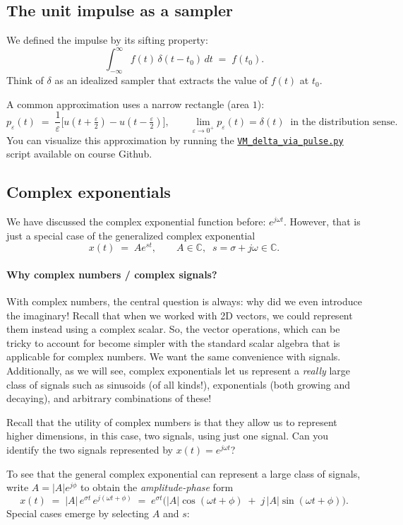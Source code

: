 \documentclass{ee102_notes}
\begin{document}
\subsection{The unit impulse as a sampler}
We defined the impulse by its sifting property:
\[
\int_{-\infty}^{\infty} f(t)\,\delta(t-t_0)\,dt \;=\; f(t_0).
\]
Think of $\delta$ as an idealized sampler that extracts the value of $f(t)$ at $t_0$.

A common approximation uses a narrow rectangle (area $1$):
\[
p_\varepsilon(t)\;=\;\frac{1}{\varepsilon}\Big[u\!\left(t+\tfrac{\varepsilon}{2}\right)-u\!\left(t-\tfrac{\varepsilon}{2}\right)\Big],
\qquad \lim_{\varepsilon\to 0^+} p_\varepsilon(t) = \delta(t)\;\; \text{in the distribution sense.}
\]
You can visualize this approximation by running the \href{https://github.com/ee-ucmerced/ee102-signals-systems/blob/main/lecture\_notes/week2\_signal\_properties/VM_delta_via_pulse.py}{{\tt VM\_delta\_via\_pulse.py}} script available on course Github.

\subsection{Complex exponentials}
We have discussed the complex exponential function before: $e^{j\omega t}$. However, that is just a special case of the generalized complex exponential
\[
x(t) \;=\; A e^{s t}, \qquad A\in\mathbb{C},\;\; s=\sigma + j\omega \in \mathbb{C}.
\]
\paragraph{Why complex numbers / complex signals?} 

With complex numbers, the central question is always: why did we even introduce the imaginary! Recall that when we worked with 2D vectors, we could represent them instead using a complex scalar. So, the vector operations, which can be tricky to account for become simpler with the standard scalar algebra that is applicable for complex numbers. We want the same convenience with signals. Additionally, as we will see, complex exponentials let us represent a \emph{really} large class of signals such as sinusoids (of all kinds!), exponentials (both growing and decaying), and arbitrary combinations of these!

\begin{popquiz} Recall that the utility of complex numbers is that they allow us to represent higher dimensions, in this case, two signals, using just one signal. Can you identify the two signals represented by $x(t) = e^{j\omega t}$?
\end{popquiz}
To see that the general complex exponential can represent a large class of signals, write $A = |A|e^{j\phi}$ to obtain the \emph{amplitude-phase} form
\[
x(t) \;=\; |A|\,e^{\sigma t}\,e^{j(\omega t + \phi)}
\;=\; e^{\sigma t}\Big(|A|\cos(\omega t+\phi) \;+\; j\,|A|\sin(\omega t+\phi)\Big).
\]
Special cases emerge by selecting $A$ and $s$:
\end{document}
